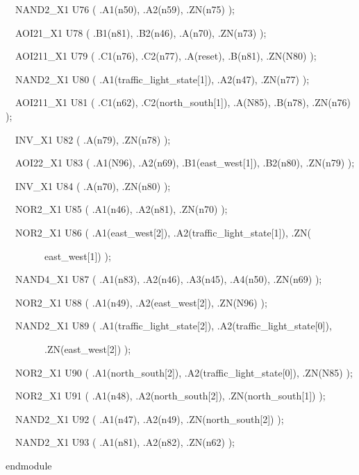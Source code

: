 \documentclass[a4paper]{article}
\begin{document}
\begin{center}
\begin{minipage}{6.01528in}
{\ttfamily\color[rgb]{0.0,0.0,0.039215688}
\ \ NAND2\_X1 U76 ( .A1(n50), .A2(n59), .ZN(n75) );}


\bigskip

{\ttfamily\color[rgb]{0.0,0.0,0.039215688}
\ \ AOI21\_X1 U78 ( .B1(n81), .B2(n46), .A(n70), .ZN(n73) );}

{\ttfamily\color[rgb]{0.0,0.0,0.039215688}
\ \ AOI211\_X1 U79 ( .C1(n76), .C2(n77), .A(reset), .B(n81), .ZN(N80)
);}

{\ttfamily\color[rgb]{0.0,0.0,0.039215688}
\ \ NAND2\_X1 U80 ( .A1(traffic\_light\_state[1]), .A2(n47), .ZN(n77)
);}

{\ttfamily\color[rgb]{0.0,0.0,0.039215688}
\ \ AOI211\_X1 U81 ( .C1(n62), .C2(north\_south[1]), .A(N85), .B(n78),
.ZN(n76) );}

{\ttfamily\color[rgb]{0.0,0.0,0.039215688}
\ \ INV\_X1 U82 ( .A(n79), .ZN(n78) );}

{\ttfamily\color[rgb]{0.0,0.0,0.039215688}
\ \ AOI22\_X1 U83 ( .A1(N96), .A2(n69), .B1(east\_west[1]), .B2(n80),
.ZN(n79) );}

{\ttfamily\color[rgb]{0.0,0.0,0.039215688}
\ \ INV\_X1 U84 ( .A(n70), .ZN(n80) );}

{\ttfamily\color[rgb]{0.0,0.0,0.039215688}
\ \ NOR2\_X1 U85 ( .A1(n46), .A2(n81), .ZN(n70) );}

{\ttfamily\color[rgb]{0.0,0.0,0.039215688}
\ \ NOR2\_X1 U86 ( .A1(east\_west[2]), .A2(traffic\_light\_state[1]),
.ZN(}

{\ttfamily\color[rgb]{0.0,0.0,0.039215688}
\ \ \ \ \ \ \ \ east\_west[1]) );}

{\ttfamily\color[rgb]{0.0,0.0,0.039215688}
\ \ NAND4\_X1 U87 ( .A1(n83), .A2(n46), .A3(n45), .A4(n50), .ZN(n69) );}

{\ttfamily\color[rgb]{0.0,0.0,0.039215688}
\ \ NOR2\_X1 U88 ( .A1(n49), .A2(east\_west[2]), .ZN(N96) );}

{\ttfamily\color[rgb]{0.0,0.0,0.039215688}
\ \ NAND2\_X1 U89 ( .A1(traffic\_light\_state[2]),
.A2(traffic\_light\_state[0]),\ }

{\ttfamily\color[rgb]{0.0,0.0,0.039215688}
\ \ \ \ \ \ \ \ .ZN(east\_west[2]) );}

{\ttfamily\color[rgb]{0.0,0.0,0.039215688}
\ \ NOR2\_X1 U90 ( .A1(north\_south[2]), .A2(traffic\_light\_state[0]),
.ZN(N85) );}

{\ttfamily\color[rgb]{0.0,0.0,0.039215688}
\ \ NOR2\_X1 U91 ( .A1(n48), .A2(north\_south[2]), .ZN(north\_south[1])
);}

{\ttfamily\color[rgb]{0.0,0.0,0.039215688}
\ \ NAND2\_X1 U92 ( .A1(n47), .A2(n49), .ZN(north\_south[2]) );}

{\ttfamily\color[rgb]{0.0,0.0,0.039215688}
\ \ NAND2\_X1 U93 ( .A1(n81), .A2(n82), .ZN(n62) );}

{\ttfamily\color[rgb]{0.0,0.0,0.039215688}
endmodule}


\bigskip
\end{minipage}
\end{center}
\end{document}
